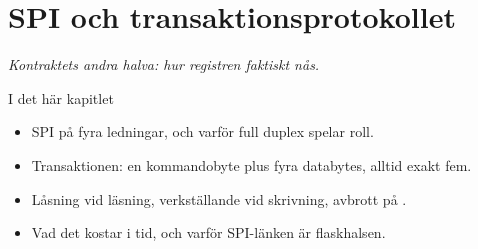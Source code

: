 \chapter{SPI och transaktionsprotokollet}
\label{ch:spi}


{\large\itshape Kontraktets andra halva: hur registren faktiskt nås.\par}

\begin{chapterbox}{I det här kapitlet}
\begin{itemize}
  \item SPI på fyra ledningar, och varför full duplex spelar roll.
  \item Transaktionen: en kommandobyte plus fyra databytes, alltid exakt fem.
  \item Låsning vid läsning, verkställande vid skrivning, avbrott på .
  \item Vad det kostar i tid, och varför SPI-länken är flaskhalsen.
\end{itemize}
\end{chapterbox}




